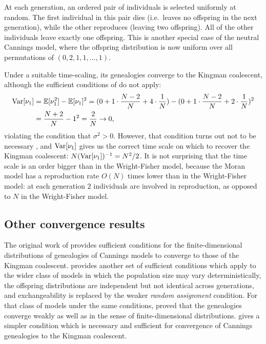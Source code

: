 At each generation, an ordered pair of individuals is selected uniformly at random. The first individual in this pair dies (i.e.\ leaves no offspring in the next generation), while the other reproduces (leaving two offspring). All of the other individuals leave exactly one offspring.
This is another special case of the neutral Cannings model, where the offspring distribution is now uniform over all permutations of $(0,2,1,1,\dots,1)$.

Under a suitable time-scaling, its genealogies converge to the Kingman coalescent\seb{[citation]}, although the sufficient conditions of \textcite{kingman1982gene} do not apply:
\begin{align*}
\operatorname{Var}[\nu_1] 
&= \mathbb{E}[\nu_1^2] - \mathbb{E}[\nu_1]^2
= (0 + 1 \cdot \frac{N-2}{N} + 4 \cdot \frac{1}{N}) - (0 + 1 \cdot \frac{N-2}{N} + 2 \cdot \frac{1}{N})^2 \\
&= \frac{N+2}{N} - 1^2
= \frac{2}{N}
\to 0 ,
\end{align*}
violating the condition that $\sigma^2 >0$. 
However, that condition turns out not to be necessary \seb{[citation]}, and $\operatorname{Var}[\nu_1]$ gives us the correct time scale on which to recover the Kingman coalescent: $N(\operatorname{Var}[\nu_1])^{-1} = N^2/2$.
It is not surprising that the time scale is an order bigger than in the Wright-Fisher model, because the Moran model has a reproduction rate $O(N)$ times lower than in the Wright-Fisher model: at each generation $2$ individuals are involved in reproduction, as opposed to $N$ in the Wright-Fisher model.




\subsection{Other convergence results}
\label{sec:previousgeneconv}
The original work of \textcite{kingman1982gene} provides sufficient conditions for the finite-dimensional distributions of genealogies of Cannings models to converge to those of the Kingman coalescent.
\textcite{mohle1998} provides another set of sufficient conditions which apply to the wider class of models in which the population size may vary deterministically, the offspring distributions are independent but not identical across generations, and exchangeability is replaced by the weaker \emph{random assignment} condition. 
For that class of models under the same conditions, \textcite{mohle1999} proved that the genealogies converge weakly as well as in the sense of finite-dimensional distributions.
\textcite{mohle2000} gives a simpler condition which is necessary and sufficient for convergence of Cannings genealogies to the Kingman coalescent. %

